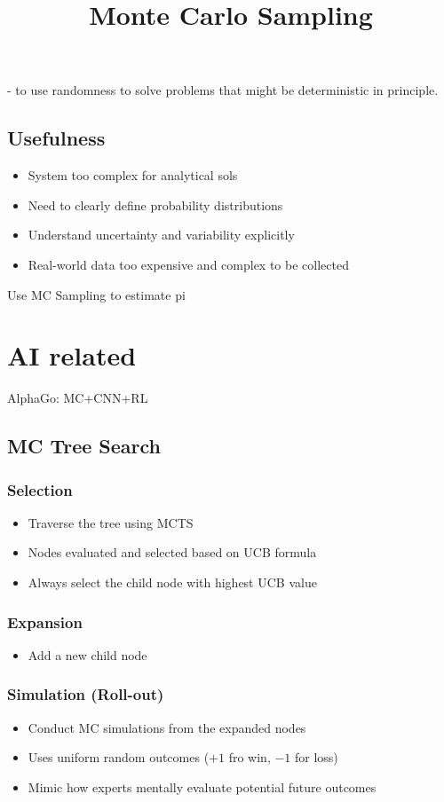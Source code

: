\documentclass[openany]{memoir}
\begin{document}
	\title{Monte Carlo Sampling}
	\maketitle
- to use randomness to solve problems that might be deterministic in principle.
	
\subsection{Usefulness}
\begin{itemize}
		\item System too complex for analytical sols
	\item Need to clearly define probability distributions
		\item Understand uncertainty and variability explicitly
		\item Real-world data too expensive and complex to be collected
\end{itemize}
\begin{example}{}{}
		Use MC Sampling to estimate pi
\end{example}
\section{AI related}
\begin{example}{}{}
		AlphaGo: MC+CNN+RL
\end{example}
\subsection{MC Tree Search}
	\subsubsection{Selection}
	\begin{itemize}
			\item Traverse the tree using MCTS
		\item Nodes evaluated and selected based on UCB formula
		\item Always select the child node with highest UCB value
	\end{itemize}
\subsubsection{Expansion}
\begin{itemize}
		\item Add a new child node
\end{itemize}
\subsubsection{Simulation (Roll-out)}
\begin{itemize}
		\item  Conduct MC simulations from the expanded nodes
		\item Uses uniform random outcomes ($+1$ fro win, $-1$ for loss)
		\item Mimic how experts mentally evaluate potential future outcomes
\end{itemize}
\end{document}
